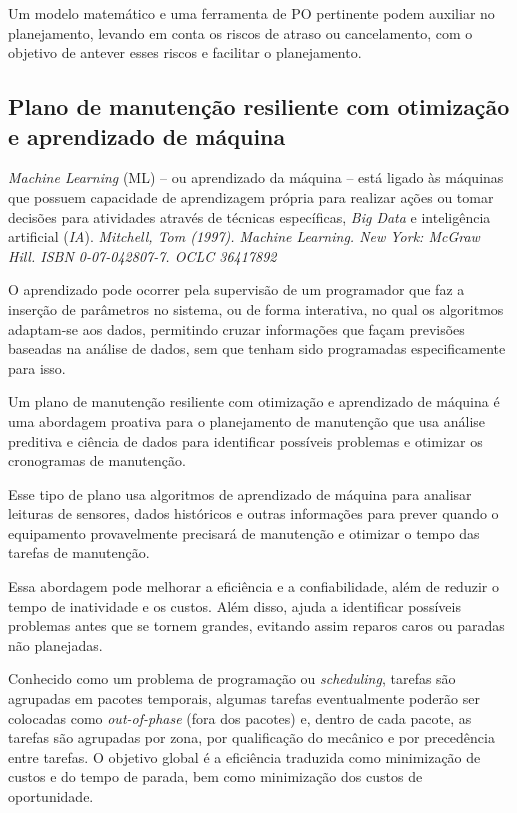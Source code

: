 \documentclass{amsart}
\begin{document}
Um modelo matemático e uma ferramenta de PO pertinente podem auxiliar no planejamento, levando em conta os riscos de atraso ou cancelamento, com o objetivo de antever esses riscos e facilitar o planejamento.

\subsection{Plano de manutenção resiliente com otimização e aprendizado de máquina}

{\it Machine Learning} (ML) – ou aprendizado da máquina – está ligado às máquinas que possuem capacidade de aprendizagem própria para realizar ações ou tomar decisões para atividades através de técnicas específicas, {\it Big Data} e inteligência artificial ({\it IA}). {\it Mitchell, Tom (1997). Machine Learning. New York: McGraw Hill. ISBN 0-07-042807-7. OCLC 36417892}  

O aprendizado pode ocorrer pela supervisão de um programador que faz a inserção de parâmetros no sistema, ou de forma interativa, no qual os algoritmos adaptam-se aos dados, permitindo cruzar informações que façam previsões baseadas na análise de dados, sem que tenham sido programadas especificamente para isso.

Um plano de manutenção resiliente com otimização e aprendizado de máquina é uma abordagem proativa para o planejamento de manutenção que usa análise preditiva e ciência de dados para identificar possíveis problemas e otimizar os cronogramas de manutenção.

Esse tipo de plano usa algoritmos de aprendizado de máquina para analisar leituras de sensores, dados históricos e outras informações para prever quando o equipamento provavelmente precisará de manutenção e otimizar o tempo das tarefas de manutenção.

Essa abordagem pode melhorar a eficiência e a confiabilidade, além de reduzir o tempo de inatividade e os custos. Além disso, ajuda a identificar possíveis problemas antes que se tornem grandes, evitando assim reparos caros ou paradas não planejadas.

Conhecido como um problema de programação ou {\it scheduling}, tarefas são agrupadas em pacotes temporais, algumas tarefas eventualmente poderão ser colocadas como {\it out-of-phase} (fora dos pacotes) e, dentro de cada pacote, as tarefas são agrupadas por zona, por qualificação do mecânico e por precedência entre tarefas.
O objetivo global é a eficiência traduzida como minimização de custos e do tempo de parada, bem como minimização dos custos de oportunidade.
\end{document}
